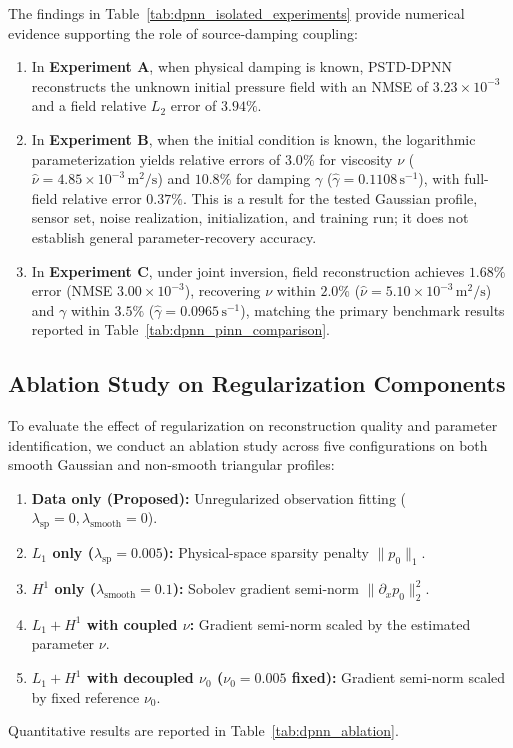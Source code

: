 \documentclass{Configuration_Files/PoliMi3i_thesis}
\newif\ifshowthesischanges
\DeclareRobustCommand{\thesischange}[2]{%
    \ifshowthesischanges
        \textcolor{#1}{#2}%
    \else
        #2%
    \fi
}
\def\thesischange#1#2{#2}%
\begin{document}
\thesischange{red}{The findings in Table~\ref{tab:dpnn_isolated_experiments} provide numerical evidence supporting the role of source-damping coupling:
\begin{enumerate}
    \item In \textbf{Experiment A}, when physical damping is known, PSTD-DPNN reconstructs the unknown initial pressure field with an NMSE of $3.23 \times 10^{-3}$ and a field relative $L_2$ error of $3.94\%$.
    \item In \textbf{Experiment B}, when the initial condition is known, the logarithmic parameterization yields relative errors of $3.0\%$ for viscosity $\nu$ ($\hat{\nu}=4.85\times10^{-3}\,\mathrm{m}^2/\mathrm{s}$) and $10.8\%$ for damping $\gamma$ ($\hat{\gamma}=0.1108\,\mathrm{s}^{-1}$), with full-field relative error $0.37\%$. This is a result for the tested Gaussian profile, sensor set, noise realization, initialization, and training run; it does not establish general parameter-recovery accuracy.
    \item In \textbf{Experiment C}, under joint inversion, field reconstruction achieves $1.68\%$ error (NMSE $3.00 \times 10^{-3}$), recovering $\nu$ within $2.0\%$ ($\hat{\nu} = 5.10 \times 10^{-3}\,\mathrm{m}^2/\mathrm{s}$) and $\gamma$ within $3.5\%$ ($\hat{\gamma} = 0.0965\,\mathrm{s}^{-1}$), matching the primary benchmark results reported in Table~\ref{tab:dpnn_pinn_comparison}.
\end{enumerate}}

\subsection{\thesischange{red}{Ablation Study on Regularization Components}}
\label{subsec:dpnn_ablation}

\thesischange{red}{To evaluate the effect of regularization on reconstruction quality and parameter identification, we conduct an ablation study across five configurations on both smooth Gaussian and non-smooth triangular profiles:
\begin{enumerate}
    \item \textbf{Data only (Proposed):} Unregularized observation fitting ($\lambda_{\mathrm{sp}} = 0, \lambda_{\mathrm{smooth}} = 0$).
    \item \textbf{$L_1$ only ($\lambda_{\mathrm{sp}} = 0.005$):} Physical-space sparsity penalty $\|p_0\|_1$.
    \item \textbf{$H^1$ only ($\lambda_{\mathrm{smooth}} = 0.1$):} Sobolev gradient semi-norm $\|\partial_x p_0\|_2^2$.
    \item \textbf{$L_1 + H^1$ with coupled $\nu$:} Gradient semi-norm scaled by the estimated parameter $\nu$.
    \item \textbf{$L_1 + H^1$ with decoupled $\nu_0$ ($\nu_0 = 0.005$ fixed):} Gradient semi-norm scaled by fixed reference $\nu_0$.
\end{enumerate}
Quantitative results are reported in Table~\ref{tab:dpnn_ablation}.}
\end{document}

